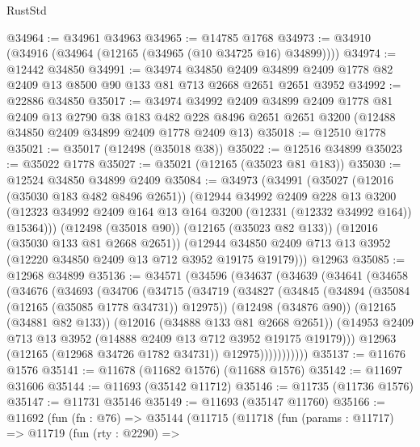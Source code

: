 \begin{lexlean}{RustStd}
\begin{coremodule}
@34964 := @34961 @34963
@34965 := @14785 @1768
@34973 := @34910 (@34916 (@34964 (@12165 (@34965 (@10 @34725 @16) @34899))))
@34974 := @12442 @34850
@34991 := @34974
    @34850
    @2409
    @34899
    @2409
    @1778
    @82
    @2409
    @13
    @8500
    @90
    @133
    @81
    @713
    @2668
    @2651
    @2651
    @3952
@34992 := @22886 @34850
@35017 := @34974
    @34992
    @2409
    @34899
    @2409
    @1778
    @81
    @2409
    @13
    @2790
    @38
    @183
    @482
    @228
    @8496
    @2651
    @2651
    @3200
    (@12488 @34850 @2409 @34899 @2409 @1778 @2409 @13)
@35018 := @12510 @1778
@35021 := @35017 (@12498 (@35018 @38))
@35022 := @12516 @34899
@35023 := @35022 @1778
@35027 := @35021 (@12165 (@35023 @81 @183))
@35030 := @12524 @34850 @34899 @2409
@35084 := @34973
    (@34991
      (@35027
        (@12016 (@35030 @183 @482 @8496 @2651))
        (@12944
          @34992
          @2409
          @228
          @13
          @3200
          (@12323 @34992 @2409 @164 @13 @164 @3200 (@12331 (@12332 @34992 @164)) @15364)))
      (@12498 (@35018 @90))
      (@12165 (@35023 @82 @133))
      (@12016 (@35030 @133 @81 @2668 @2651))
      (@12944 @34850 @2409 @713 @13 @3952 (@12220 @34850 @2409 @13 @712 @3952 @19175 @19179)))
    @12963
@35085 := @12968 @34899
@35136 := @34571
    (@34596
      (@34637
        (@34639
          (@34641
            (@34658
              (@34676
                (@34693
                  (@34706
                    (@34715
                      (@34719
                        (@34827
                          (@34845
                            (@34894 (@35084 (@12165 (@35085 @1778 @34731)) @12975))
                            (@12498 (@34876 @90))
                            (@12165 (@34881 @82 @133))
                            (@12016 (@34888 @133 @81 @2668 @2651))
                            (@14953
                              @2409
                              @713
                              @13
                              @3952
                              (@14888 @2409 @13 @712 @3952 @19175 @19179)))
                          @12963
                          (@12165 (@12968 @34726 @1782 @34731))
                          @12975)))))))))))
@35137 := @11676 @1576
@35141 := @11678 (@11682 @1576) (@11688 @1576)
@35142 := @11697 @31606
@35144 := @11693 (@35142 @11712)
@35146 := @11735 (@11736 @1576)
@35147 := @11731 @35146
@35149 := @11693 (@35147 @11760)
@35166 := @11692
    (fun (fn : @76) =>
    @35144
      (@11715
        (@11718
          (fun (params : @11717) =>
          @11719
            (fun (rty : @2290) =>

\end{coremodule}
\end{lexlean}
